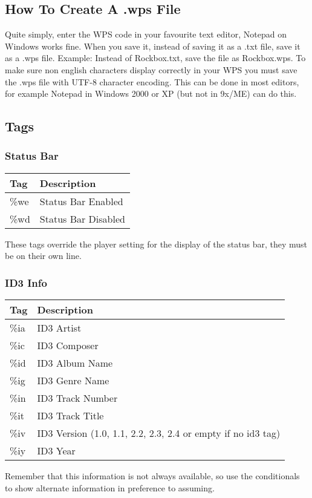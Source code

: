 \subsection{How To Create A .wps File}
Quite simply, enter the WPS code in your favourite text editor, Notepad on Windows works fine. When you save it, instead of saving it as a .txt file, save it as a .wps file. Example: Instead of Rockbox.txt, save the file as Rockbox.wps. To make sure non english characters display correctly in your WPS you must save the .wps file with UTF-8 character encoding. This can be done in most editors, for example Notepad in Windows 2000 or XP (but not in 9x/ME) can do this.

\subsection{Tags}

\subsubsection{Status Bar}
\begin{center}
  \begin{tabular}{@{}ll@{}}\toprule
    \textbf{Tag} & \textbf{Description}\\\midrule
    \%we & Status Bar Enabled\\
    \%wd & Status Bar Disabled\\\bottomrule
  \end{tabular}
\end{center}
These tags override the player setting for the display of the status bar, they must be on their own line.

\subsubsection{ID3 Info}
\begin{center}
  \begin{tabular}{@{}ll@{}}\toprule
    \textbf{Tag} & \textbf{Description}\\\midrule
    \%ia & ID3 Artist\\
    \%ic & ID3 Composer\\
    \%id & ID3 Album Name\\
    \%ig & ID3 Genre Name\\
    \%in & ID3 Track Number\\
    \%it & ID3 Track Title\\
    \%iv & ID3 Version (1.0, 1.1, 2.2, 2.3, 2.4 or empty if no id3 tag)\\
    \%iy & ID3 Year\\\bottomrule
  \end{tabular}
\end{center}
Remember that this information is not always available, so use the conditionals to show alternate information in preference to assuming.

